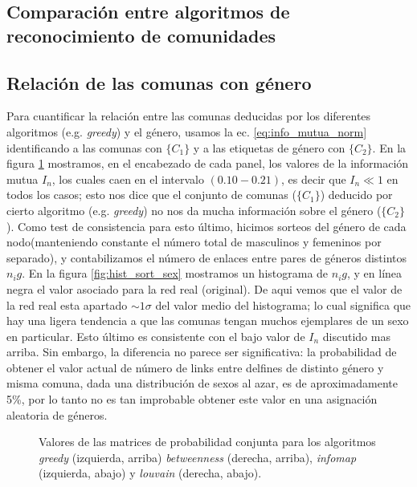 \subsection{Comparaci\'on entre algoritmos de reconocimiento de comunidades}


\subsection{Relaci\'on de las comunas con g\'enero}
\label{sec:relacion_con_genero}

Para cuantificar la relaci\'on entre las comunas deducidas por los diferentes algoritmos (e.g. {\it greedy}) y el g\'enero, usamos la ec. \ref{eq:info_mutua_norm} identificando a las comunas con $\{C_1\}$ y a las etiquetas de g\'enero con $\{C_2\}$.
En la figura \ref{fig:prob_conj} mostramos, en el encabezado de cada panel, los valores de la informaci\'on mutua $I_n$, los cuales caen en el intervalo $(0.10 - 0.21)$, es decir que $I_n \ll 1$ en todos los casos; esto nos dice que el conjunto de comunas ($\{C_1\}$) deducido por cierto algoritmo (e.g. {\it greedy}) no nos da mucha informaci\'on sobre el g\'enero ($\{C_2\}$).
Como test de consistencia para esto  \'ultimo, hicimos sorteos del g\'enero de cada nodo(manteniendo constante el n\'umero total de masculinos y femeninos por separado), y contabilizamos el n\'umero de enlaces entre pares de g\'eneros distintos $n_ig$.
En la figura \ref{fig:hist_sort_sex} mostramos un histograma de $n_ig$, y en l\'inea negra el valor asociado para la red real (original).
De aqui vemos que el valor de la red real esta apartado $\sim 1 \sigma$ del valor medio del histograma; lo cual significa que hay una ligera tendencia a que las comunas tengan muchos ejemplares de un sexo en particular. 
Esto \'ultimo es consistente con el bajo valor de $I_n$ discutido mas arriba.
Sin embargo, la diferencia no parece ser significativa: la probabilidad de obtener el valor actual de número de links entre delfines de distinto género y misma comuna, dada una distribución de sexos al azar, es de aproximadamente 5\%, por lo tanto no es tan improbable obtener este valor en una asignación aleatoria de géneros.



\begin{figure}
    \centering
    \caption{
    Valores de las matrices de probabilidad conjunta para los algoritmos {\it greedy} (izquierda, arriba) {\it betweenness} (derecha, arriba), {\it infomap} (izquierda, abajo) y {\it louvain} (derecha, abajo). 
    }
\label{fig:prob_conj}
\end{figure}


